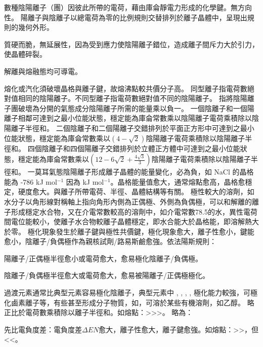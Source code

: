 \documentclass[a4paper,12pt]{report}
\begin{document}
數種陰陽離子（團）因彼此所帶的電荷，藉由庫侖靜電力形成的化學鍵。無方向性。
陽離子與陰離子以總電荷為零的比例規則交替排列於離子晶體中，呈現出規則的幾何外形。
\bit
\item 質硬而脆，無延展性，因為受到應力使陰陽離子錯位，造成離子間斥力大於引力，使晶體碎裂。
\item 解離與熔融態均可導電。
\item 熔化或汽化須破壞晶格與離子鍵，故熔沸點較共價分子高。
\eit
{}
同型離子指電荷數絕對值相同的陰陽離子。不同型離子指電荷數絕對值不同的陰陽離子。
指將陰陽離子團破壞為分開的氣態成分陰陽離子所需的能量乘以負一。
一個陰離子和一個陽離子相鄰可達到之最小位能狀態，穩定能為庫侖常數乘以陰陽離子電荷乘積除以陰陽離子半徑和。
二個陰離子和二個陽離子交錯排列於平面正方形中可達到之最小位能狀態，穩定能為庫侖常數乘以$(4-\sqrt{2})$陰陽離子電荷乘積除以陰陽離子半徑和。
四個陰離子和四個陽離子交錯排列於立體正方體中可達到之最小位能狀態，穩定能為庫侖常數乘以$(12-6\sqrt{2}+\frac{4\sqrt{3}}{3})$陰陽離子電荷乘積除以陰陽離子半徑和。
一莫耳氣態陰陽離子形成離子晶體的能量變化，必為負，如 NaCl 的晶格能為 -786 kJ mol$^{-1}$ 因為  kJ mol$^{-1}$。晶格能量值愈大，通常熔點愈高，晶格愈穩定，硬度愈大。與離子所帶電荷、半徑、晶體結構等有關。
極性較大的溶劑，如水分子以角形線對稱軸上指向角形內側為正偶極、外側為負偶極，可以和解離的離子形成穩定水合物，又在介電常數較高的溶劑中，如介電常數78.5的水，異性電荷間電位能較小，使離子水合物較離子晶體穩定，即水合能大於晶格能，即溶解熱大於零。
極化現象發生於離子鍵與極性共價鍵，極化現象愈大，離子性愈小，鍵能愈小，陰離子/負偶極作為親核試劑/路易斯鹼愈強。依法陽斯規則：
\bit
\item 陽離子/正偶極半徑愈小或電荷愈大，愈易極化陰離子/負偶極。
\item 陰離子/負偶極半徑愈大或電荷愈大，愈易被陽離子/正偶極極化。
\item 過渡元素通常比典型元素容易極化陰離子，典型元素中 , , , ,  極化能力較強，可極化鹵素離子等，有些甚至形成分子物質，如，可溶於某些有機溶劑，如乙醇。
\eit
{}
略正比於電荷數乘積除以離子半徑和。如熔點：>>>。
略為：
\bit
\item 先比電負度差：電負度差$\Delta EN$愈大，離子性愈大，離子鍵愈強。如熔點：>>，但 <<。
\end{document}
